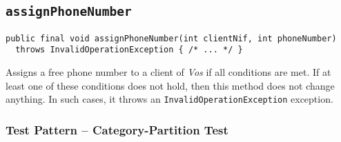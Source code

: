 %
%
%
\subsection{\texttt{assignPhoneNumber}}
\label{sec:methods.assignPhoneNumber}
\begin{verbatim}
public final void assignPhoneNumber(int clientNif, int phoneNumber)
  throws InvalidOperationException { /* ... */ }
\end{verbatim}

Assigns a free phone number to a client of \textit{Vos} if all conditions are
met. If at least one of these conditions does not hold, then this method does
not change anything. In such cases, it throws an
\texttt{InvalidOperationException} exception.

\subsubsection{Test Pattern -- Category-Partition Test}
\label{sec:methods.assignPhoneNumber.pattern}

